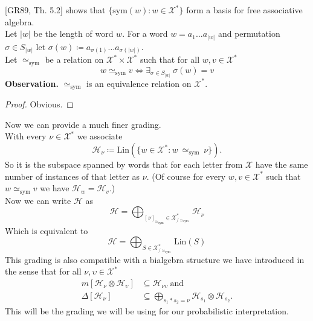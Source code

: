 \documentclass[a4paper, 12pt]{article}
\newcommand{\SimeqSym}{{\simeq_\mathrm{sym}}}
\begin{document}
[GR89, Th. 5.2] \label{basis}shows that $\{\mathrm{sym}(w) : w \in \mathcal{X^*}\}$ form a basis for free associative
algebra. \\
Let $|w|$ be the length of word $w$. For a word $w = a_1\dots a_{|w|}$ and permutation
$\sigma \in S_{|w|}$ let $\sigma(w) \coloneqq a_{\sigma(1)}\dots a_{\sigma(|w|)}$. \\
Let $\simeq_\mathrm{sym}$ be
a relation on $\mathcal{X}^* \times \mathcal{X}^*$ such that for all $w, v \in \mathcal{X}^*$
\begin{equation*}
w \simeq_\mathrm{sym} v \iff \exists_{\sigma \in S_{|w|}}\ \sigma(w) = v
\end{equation*}
\textbf{Observation.} $\simeq_\mathrm{sym}$ is an equivalence relation on $\mathcal{X}^*$.
\begin{proof}
Obvious.
\end{proof}
\noindent Now we can provide a much finer grading. \\
With every $\nu \in \mathcal{X}^*$ we associate
\begin{equation}
\mathcal{H}_\nu \coloneqq \mathrm{Lin}(\{w \in \mathcal{X}^* : w\ \SimeqSym\ \nu\}).
\end{equation}
So it is the subspace spanned by words that for each letter from $\mathcal{X}$ have the same number of
instances of that letter as
$\nu$. (Of course for every $w, v \in \mathcal{X}^*$ such that $w \SimeqSym v$ we have
$\mathcal{H}_w = \mathcal{H}_v$.) \\
Now we can write $\mathcal{H}$ as
\begin{equation*}
\mathcal{H} = \bigoplus_{{[\nu]}_\SimeqSym \in \mathcal{X}^*_{/\SimeqSym}} \mathcal{H}_\nu
\end{equation*}
Which is equivalent to
\begin{equation*}
\mathcal{H} = \bigoplus_{S \in \mathcal{X}^*_{/\SimeqSym}} \mathrm{Lin}(S)
\end{equation*}
This grading is also compatible with a bialgebra structure we have introduced in the sense that for all
$\nu, \upsilon \in \mathcal{X}^*$
\begin{align*}
m[\mathcal{H}_\nu \otimes \mathcal{H}_\upsilon] &\subseteq \mathcal{H}_{\nu\upsilon} \mathrm{\ and} \\
\Delta[\mathcal{H}_\nu] &\subseteq \bigoplus_{s_1*s_2=\nu}
\mathcal{H}_{s_1} \otimes \mathcal{H}_{s_2}.
\end{align*}
This will be the grading we will be using for our probabilistic interpretation.
\end{document}
